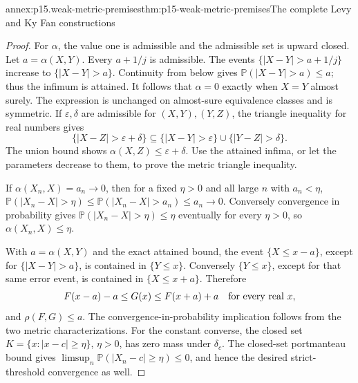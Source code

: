 \begin{annexitem}{annex:p15.weak-metric-premises}{thm:p15-weak-metric-premises}{The complete Levy and Ky Fan constructions}
\begin{proof}
For \(\alpha\), the value one is admissible and the
admissible set is upward closed. Let \(a=\alpha(X,Y)\).
Every \(a+1/j\) is admissible. The events
\(\{|X-Y|>a+1/j\}\) increase to \(\{|X-Y|>a\}\).
Continuity from below gives
\(\mathbb P(|X-Y|>a)\leq a\); thus the infimum is attained.
It follows that \(\alpha=0\) exactly when \(X=Y\)
almost surely. The expression is unchanged on almost-sure
equivalence classes and is symmetric.
If \(\varepsilon,\delta\) are admissible for \((X,Y),(Y,Z)\),
the triangle inequality for real numbers gives
\[
 \{|X-Z|>\varepsilon+\delta\}
 \subseteq\{|X-Y|>\varepsilon\}\cup\{|Y-Z|>\delta\}.
\]
The union bound shows \(\alpha(X,Z)\leq\varepsilon+\delta\).
Use the attained infima, or let the parameters decrease
to them, to prove the metric triangle inequality.

If \(\alpha(X_n,X)=a_n\to0\), then for a fixed \(\eta>0\)
and all large \(n\) with \(a_n<\eta\),
\(\mathbb P(|X_n-X|>\eta)\leq
\mathbb P(|X_n-X|>a_n)\leq a_n\to0\).
Conversely convergence in probability gives
\(\mathbb P(|X_n-X|>\eta)\leq\eta\) eventually for every
\(\eta>0\), so \(\alpha(X_n,X)\leq\eta\).

With \(a=\alpha(X,Y)\) and the exact attained bound,
the event \(\{X\leq x-a\}\), except for
\(\{|X-Y|>a\}\), is contained in \(\{Y\leq x\}\).
Conversely \(\{Y\leq x\}\), except for that same error
event, is contained in \(\{X\leq x+a\}\).
Therefore
\[
 F(x-a)-a\leq G(x)\leq F(x+a)+a
 \quad\hbox{for every real }x,
\]
and \(\rho(F,G)\leq a\).
The convergence-in-probability implication follows from
the two metric characterizations.
For the constant converse, the closed set
\(K=\{x:|x-c|\geq\eta\}\), \(\eta>0\), has zero mass
under \(\delta_c\). The closed-set portmanteau bound gives
\(\limsup_n\mathbb P(|X_n-c|\geq\eta)\leq0\),
and hence the desired strict-threshold convergence as well.
\end{proof}
\end{annexitem}

